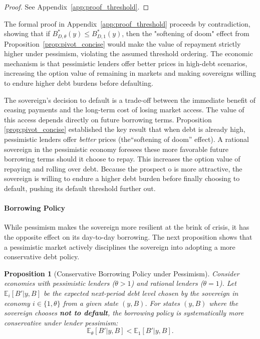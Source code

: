 \documentclass[12pt]{article}
\theoremstyle{plain}
\newtheorem{proposition}{Proposition}
\begin{document}
\begin{proof}
	See Appendix~\ref{app:proof_threshold}.
\end{proof}
The formal proof in Appendix~\ref{app:proof_threshold} proceeds by contradiction, showing that if $B^*_{D,\theta}(y) \leq B^*_{D,1}(y)$, then the "softening of doom" effect from Proposition~\ref{prop:pivot_concise} would make the value of repayment strictly higher under pessimism, violating the assumed threshold ordering. The economic mechanism is that pessimistic lenders offer better prices in high-debt scenarios, increasing the option value of remaining in markets and making sovereigns willing to endure higher debt burdens before defaulting.

The sovereign's decision to default is a trade-off between the immediate
benefit of ceasing payments and the long-term cost of losing market access. The
value of this access depends directly on future borrowing terms. Proposition
\ref{prop:pivot_concise} established the key result that when debt is already
high, pessimistic lenders offer \textit{better} prices (the``softening of
doom'' effect). A rational sovereign in the pessimistic economy foresees these
more favorable future borrowing terms should it choose to repay. This increases
the option value of repaying and rolling over debt. Because the prospect o is
more attractive, the sovereign is willing to endure a higher debt burden before
finally choosing to default, pushing its default threshold further out.

\paragraph{Borrowing Policy}
While pessimism makes the sovereign more resilient at the brink of crisis, it
has the opposite effect on its day-to-day borrowing. The next proposition shows
that a pessimistic market actively disciplines the sovereign into adopting a
more conservative debt policy.

\begin{proposition}[Conservative Borrowing Policy under Pessimism]
	\label{prop:deleveraging}
	Consider economies with pessimistic lenders ($\theta > 1$) and rational lenders ($\theta = 1$). Let $\mathbb{E}_i[B'|y, B]$ be the expected next-period debt level chosen by the sovereign in economy $i \in \{1, \theta\}$ from a given state $(y, B)$. For states $(y, B)$ where the sovereign chooses \textbf{not to default}, the borrowing policy is systematically more conservative under lender pessimism:
	\begin{equation*}
		\mathbb{E}_\theta[B'|y, B] < \mathbb{E}_1[B'|y, B].
	\end{equation*}
\end{proposition}
\end{document}
